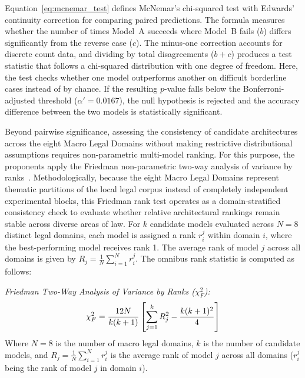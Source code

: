     Equation~\ref{eq:mcnemar_test} defines McNemar's chi-squared test with Edwards' continuity correction for comparing paired predictions. The formula measures whether the number of times Model~A succeeds where Model~B fails ($b$) differs significantly from the reverse case ($c$). The minus-one correction accounts for discrete count data, and dividing by total disagreements ($b+c$) produces a test statistic that follows a chi-squared distribution with one degree of freedom. Here, the test checks whether one model outperforms another on difficult borderline cases instead of by chance. If the resulting $p$-value falls below the Bonferroni-adjusted threshold ($\alpha' = 0.0167$), the null hypothesis is rejected and the accuracy difference between the two models is statistically significant.

    Beyond pairwise significance, assessing the consistency of candidate architectures across the eight Macro Legal Domains without making restrictive distributional assumptions requires non-parametric multi-model ranking. For this purpose, the proponents apply the Friedman non-parametric two-way analysis of variance by ranks~\cite{friedman1937use, demsar2006statistical}. Methodologically, because the eight Macro Legal Domains represent thematic partitions of the local legal corpus instead of completely independent experimental blocks, this Friedman rank test operates as a domain-stratified consistency check to evaluate whether relative architectural rankings remain stable across diverse areas of law. For $k$ candidate models evaluated across $N = 8$ distinct legal domains, each model is assigned a rank $r_i^j$ within domain $i$, where the best-performing model receives rank 1. The average rank of model $j$ across all domains is given by $R_j = \frac{1}{N}\sum_{i=1}^N r_i^j$. The omnibus rank statistic is computed as follows:

    \noindent\textit{Friedman Two-Way Analysis of Variance by Ranks ($\chi_F^2$):}
    \begin{equation}
        \chi_F^2 = \frac{12N}{k(k+1)}\left[\sum_{j=1}^k R_j^2 - \frac{k(k+1)^2}{4}\right]
        \label{eq:friedman_test}
        \eqcaption{Friedman Two-Way Analysis of Variance by Ranks ($\chi_F^2$)}
    \end{equation}
    \noindent Where $N = 8$ is the number of macro legal domains, $k$ is the number of candidate models, and $R_j = \frac{1}{N}\sum_{i=1}^N r_i^j$ is the average rank of model $j$ across all domains ($r_i^j$ being the rank of model $j$ in domain $i$).

